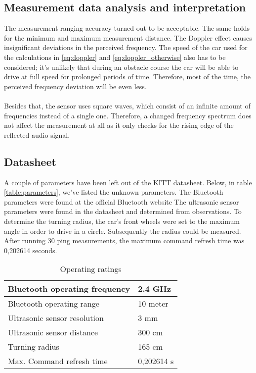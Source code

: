 \documentclass[final]{scrreprt} %
\begin{document}
\subsection{Measurement data analysis and interpretation}

The measurement ranging accuracy turned out to be acceptable. 
The same holds for the minimum and maximum measurement distance. 
The Doppler effect causes insignificant deviations in the perceived frequency. 
The speed of the car used for the calculations in \ref{eq:doppler} and \ref{eq:doppler_otherwise} also has to be considered; it's unlikely that during an obstacle course the car will be able to drive at full speed for prolonged periods of time.
Therefore, most of the time, the perceived frequency deviation will be even less.
\\ \\
Besides that, the sensor uses square waves, which consist of an infinite amount of frequencies instead of a single one.
Therefore, a changed frequency spectrum does not affect the measurement at all as it only checks for the rising edge of the reflected audio signal.

\subsection{Datasheet}

A couple of parameters have been left out of the KITT datasheet. Below, in table \ref{table:parameters}, we've listed the unknown parameters. The Bluetooth parameters were found at the official Bluetooth website %
The ultrasonic sensor parameters were found in the datasheet and determined from observations. 
To determine the turning radius, the car's front wheels were set to the maximum angle in order to drive in a circle. Subsequently the radius could be measured. 
After running 30 ping measurements, the maximum command refresh time was 0,202614 seconds.

\begin{table}[H]
\begin{center}
\begin{tabular}{ | l | l |}
    \hline
    Bluetooth operating frequency & 2.4 GHz \\ \hline
    Bluetooth operating range & 10 meter \\\hline
    Ultrasonic sensor resolution    & 3 mm \\\hline
    Ultrasonic sensor distance	         & 300 cm \\\hline
    Turning radius & 165 cm \\\hline
    Max. Command refresh time & 0,202614 s\\\hline
\end{tabular}
\caption{Operating ratings}
\end{center}
\end{table}
\label{table:parameters}
\end{document}
